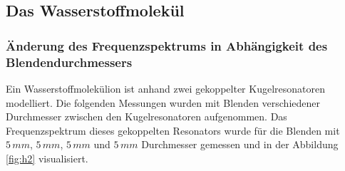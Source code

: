 \subsection{Das Wasserstoffmolekül}
\subsubsection{Änderung des Frequenzspektrums in Abhängigkeit des Blendendurchmessers}
\label{sec:h2peaks}
Ein Wasserstoffmolekülion ist anhand zwei gekoppelter Kugelresonatoren modelliert. Die folgenden Messungen wurden mit Blenden verschiedener Durchmesser zwischen den Kugelresonatoren 
aufgenommen. Das Frequenzspektrum dieses gekoppelten Resonators wurde für die Blenden mit $5\,mm$, $5\,mm$, $5\,mm$ und $5\,mm$ Durchmesser gemessen und in der Abbildung \ref{fig:h2} visualisiert. \\\\

